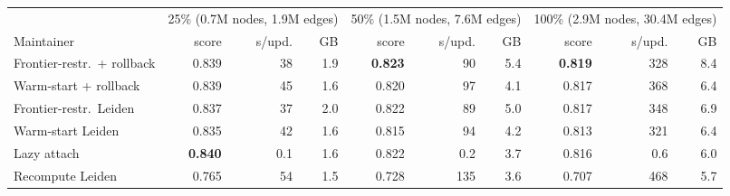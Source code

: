 \begin{tabular}{l rrr rrr rrr}
\toprule
 & \multicolumn{3}{c}{25\% (0.7M nodes, 1.9M edges)} & \multicolumn{3}{c}{50\% (1.5M nodes, 7.6M edges)} & \multicolumn{3}{c}{100\% (2.9M nodes, 30.4M edges)}\\
\cmidrule(lr){2-4}\cmidrule(lr){5-7}\cmidrule(lr){8-10}
 Maintainer & score & s/upd. & GB & score & s/upd. & GB & score & s/upd. & GB\\
\midrule
Frontier-restr.\ + rollback & 0.839 & 38 & 1.9 & \textbf{0.823} & 90 & 5.4 & \textbf{0.819} & 328 & 8.4 \\
Warm-start + rollback & 0.839 & 45 & 1.6 & 0.820 & 97 & 4.1 & 0.817 & 368 & 6.4 \\
Frontier-restr.\ Leiden & 0.837 & 37 & 2.0 & 0.822 & 89 & 5.0 & 0.817 & 348 & 6.9 \\
Warm-start Leiden & 0.835 & 42 & 1.6 & 0.815 & 94 & 4.2 & 0.813 & 321 & 6.4 \\
Lazy attach & \textbf{0.840} & 0.1 & 1.6 & 0.822 & 0.2 & 3.7 & 0.816 & 0.6 & 6.0 \\
Recompute Leiden & 0.765 & 54 & 1.5 & 0.728 & 135 & 3.6 & 0.707 & 468 & 5.7 \\
\bottomrule
\end{tabular}
